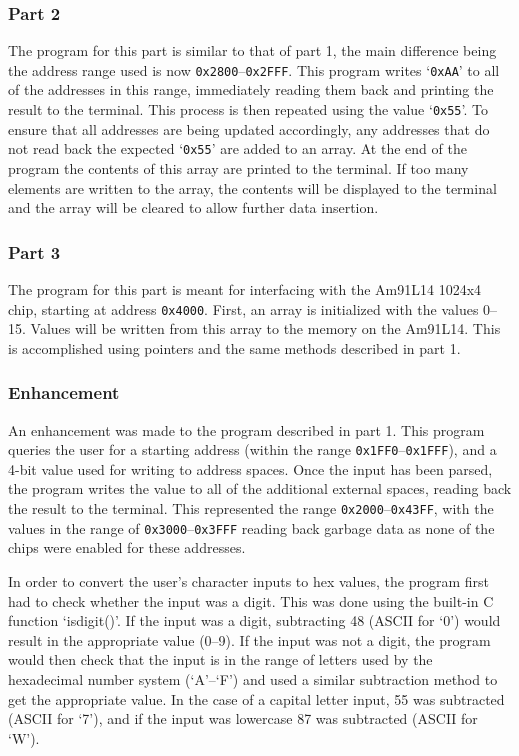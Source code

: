 \documentclass[12pt]{article}
\begin{document}
\subsubsection{Part 2}
The program for this part is similar to that of part 1, the main difference being the address range used is now \texttt{0x2800}--\texttt{0x2FFF}. This program writes `\texttt{0xAA}' to all of the addresses in this range, immediately reading them back and printing the result to the terminal. This process is then repeated using the value `\texttt{0x55}'. To ensure that all addresses are being updated accordingly, any addresses that do not read back the expected `\texttt{0x55}' are added to an array. At the end of the program the contents of this array are printed to the terminal. If too many elements are written to the array, the contents will be displayed to the terminal and the array will be cleared to allow further data insertion.

\subsubsection{Part 3}
The program for this part is meant for interfacing with the Am91L14 1024x4 chip, starting at address \texttt{0x4000}. First, an array is initialized with the values 0--15. Values will be written from this array to the memory on the Am91L14. This is accomplished using pointers and the same methods described in part 1. 

\subsubsection{Enhancement}
An enhancement was made to the program described in part 1. This program queries the user for a starting address (within the range \texttt{0x1FF0}--\texttt{0x1FFF}), and a 4-bit value used for writing to address spaces. Once the input has been parsed, the program writes the value to all of the additional external spaces, reading back the result to the terminal. This represented the range \texttt{0x2000}--\texttt{0x43FF}, with the values in the range of \texttt{0x3000}--\texttt{0x3FFF} reading back garbage data as none of the chips were enabled for these addresses. 

In order to convert the user's character inputs to hex values, the program first had to check whether the input was a digit. This was done using the built-in C function `isdigit()'. If the input was a digit, subtracting 48 (ASCII for `0') would result in the appropriate value (0--9). If the input was not a digit, the program would then check that the input is in the range of letters used by the hexadecimal number system (`A'--`F') and used a similar subtraction method to get the appropriate value. In the case of a capital letter input, 55 was subtracted (ASCII for `7'), and if the input was lowercase 87 was subtracted (ASCII for `W').
\end{document}
